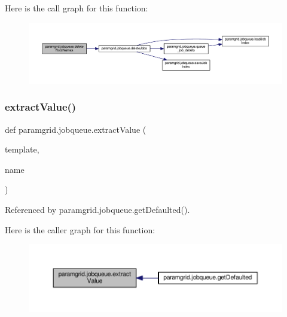 Here is the call graph for this function\+:
\nopagebreak
\begin{figure}[H]
\begin{center}
\leavevmode
\includegraphics[width=350pt]{namespaceparamgrid_1_1jobqueue_a3c9cbe684a6be879c4a25253e6e9dafe_cgraph}
\end{center}
\end{figure}
\mbox{\label{namespaceparamgrid_1_1jobqueue_a0735153d2189fa2f6e00c8d5fcb2a01f}} 
\subsubsection{\texorpdfstring{extract\+Value()}{extractValue()}}
{\footnotesize\ttfamily def paramgrid.\+jobqueue.\+extract\+Value (\begin{DoxyParamCaption}\item[{}]{template,  }\item[{}]{name }\end{DoxyParamCaption})}



Referenced by paramgrid.\+jobqueue.\+get\+Defaulted().

Here is the caller graph for this function\+:
\nopagebreak
\begin{figure}[H]
\begin{center}
\leavevmode
\includegraphics[width=350pt]{namespaceparamgrid_1_1jobqueue_a0735153d2189fa2f6e00c8d5fcb2a01f_icgraph}
\end{center}
\end{figure}
\mbox{\label{namespaceparamgrid_1_1jobqueue_a46526092620bf46ab99b066c5c44d038}} 
